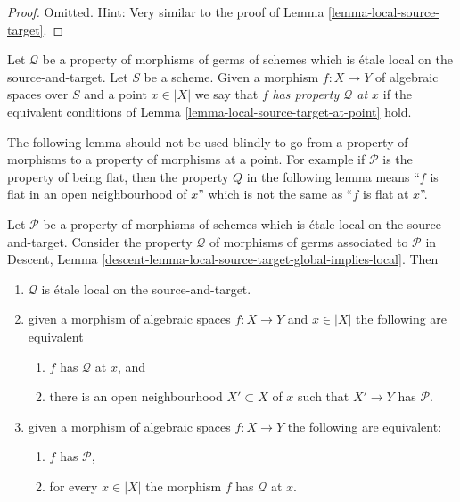 \begin{proof}
Omitted. Hint: Very similar to the proof of
Lemma \ref{lemma-local-source-target}.
\end{proof}

\begin{definition}
\label{definition-P-at-point}
Let $\mathcal{Q}$ be a property of morphisms of germs
of schemes which is \'etale local on the source-and-target.
Let $S$ be a scheme.
Given a morphism $f : X \to Y$ of algebraic spaces over $S$ and
a point $x \in |X|$ we say that $f$
{\it has property $\mathcal{Q}$ at $x$} if the equivalent conditions of
Lemma \ref{lemma-local-source-target-at-point}
hold.
\end{definition}

\noindent
The following lemma should not be used blindly to go from a property of
morphisms to a property of morphisms at a point. For example if
$\mathcal{P}$ is the property of being flat, then the property
$Q$ in the following lemma means ``$f$ is flat in an open neighbourhood
of $x$'' which is not the same as ``$f$ is flat at $x$''.

\begin{lemma}
\label{lemma-local-source-target-global-implies-local}
Let $\mathcal{P}$ be a property of morphisms of schemes
which is \'etale local on the source-and-target.
Consider the property $\mathcal{Q}$ of morphisms
of germs associated to $\mathcal{P}$ in
Descent, Lemma \ref{descent-lemma-local-source-target-global-implies-local}.
Then
\begin{enumerate}
\item $\mathcal{Q}$ is \'etale local on the source-and-target.
\item given a morphism of algebraic spaces $f : X \to Y$ and $x \in |X|$
the following are equivalent
\begin{enumerate}
\item $f$ has $\mathcal{Q}$ at $x$, and
\item there is an open neighbourhood $X' \subset X$ of $x$
such that $X' \to Y$ has $\mathcal{P}$.
\end{enumerate}
\item given a morphism of algebraic spaces $f : X \to Y$
the following are equivalent:
\begin{enumerate}
\item $f$ has $\mathcal{P}$,
\item for every $x \in |X|$ the morphism $f$ has $\mathcal{Q}$ at $x$.
\end{enumerate}
\end{enumerate}
\end{lemma}

